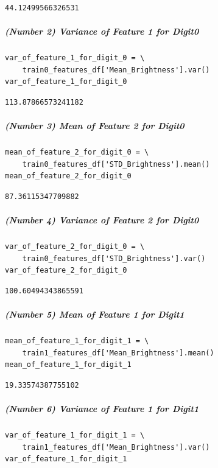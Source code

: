 \begin{verbatim}
44.12499566326531
\end{verbatim}

\subparagraph{(Number 2) Variance of Feature 1 for Digit0}

\begin{verbatim}
var_of_feature_1_for_digit_0 = \
    train0_features_df['Mean_Brightness'].var()
var_of_feature_1_for_digit_0
\end{verbatim}

\begin{verbatim}
113.87866573241182
\end{verbatim}

\subparagraph{(Number 3) Mean of Feature 2 for Digit0}

\begin{verbatim}
mean_of_feature_2_for_digit_0 = \
    train0_features_df['STD_Brightness'].mean()
mean_of_feature_2_for_digit_0
\end{verbatim}

\begin{verbatim}
87.36115347709882
\end{verbatim}

\subparagraph{(Number 4) Variance of Feature 2 for Digit0}

\begin{verbatim}
var_of_feature_2_for_digit_0 = \
    train0_features_df['STD_Brightness'].var()
var_of_feature_2_for_digit_0
\end{verbatim}

\begin{verbatim}
100.60494343865591
\end{verbatim}

\subparagraph{(Number 5) Mean of Feature 1 for Digit1}

\begin{verbatim}
mean_of_feature_1_for_digit_1 = \
    train1_features_df['Mean_Brightness'].mean()
mean_of_feature_1_for_digit_1
\end{verbatim}

\begin{verbatim}
19.33574387755102
\end{verbatim}

\subparagraph{(Number 6) Variance of Feature 1 for Digit1}

\begin{verbatim}
var_of_feature_1_for_digit_1 = \
    train1_features_df['Mean_Brightness'].var()
var_of_feature_1_for_digit_1
\end{verbatim}

